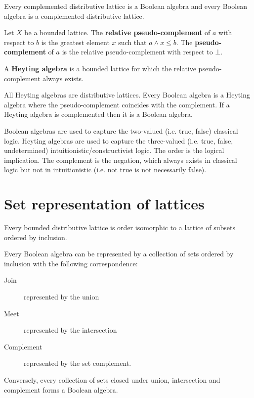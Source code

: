 \documentclass{article}
\newcommand{\marginleft}[1] {\reversemarginpar\marginpar{#1}}
\begin{document}
\begin{prop}
	Every complemented distributive lattice is a Boolean algebra and every Boolean algebra is a complemented distributive lattice.
\end{prop}

\begin{defn}
	Let $X$ be \marginleft{Pseudo-complement} a bounded lattice. The \textbf{relative pseudo-complement} of $a$ with respect to $b$ is the greatest element $x$ such that $a \wedge x \leq b$. The \textbf{pseudo-complement} of $a$ is the relative pseudo-complement with respect to $\bot$.
\end{defn}

\begin{defn}
	A \textbf{Heyting algebra} \marginleft{Heyting \\ algebra} is a bounded lattice for which the relative pseudo-complement always exists.
\end{defn}

\begin{prop}
	All Heyting algebras are distributive lattices. Every Boolean algebra is a Heyting algebra where the pseudo-complement coincides with the complement. If a Heyting algebra is complemented then it is a Boolean algebra.
\end{prop}

\begin{remark}
	Boolean algebras are used to capture the two-valued (i.e. true, false) classical logic. Heyting algebras are used to capture the three-valued (i.e. true, false, undetermined) intuitionistic/constructivist logic. The order is the logical implication. The complement is the negation, which always exists in classical logic but not in intuitionistic (i.e. not true is not necessarily false).
\end{remark}

\section{Set representation of lattices}

\begin{prop}
	Every bounded distributive lattice is order isomorphic to a lattice of subsets ordered by inclusion.
\end{prop}

\begin{prop}
	Every Boolean algebra can be represented by a collection of sets ordered by inclusion with the following correspondence:
	\begin{description}
		\item[Join] represented by the union
		\item[Meet] represented by the intersection
		\item[Complement] represented by the set complement.
	\end{description}
	Conversely, every collection of sets closed under union, intersection and complement forms a Boolean algebra.
\end{prop}
\end{document}
